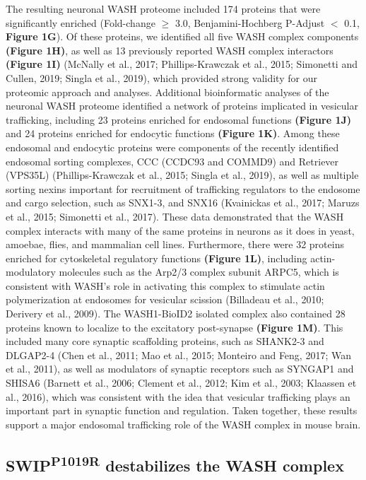 The resulting neuronal WASH proteome included 174 proteins that were
significantly enriched (Fold-change $\geq$ 3.0, Benjamini-Hochberg P-Adjust $<$ 0.1,
\textbf{Figure 1G}). Of these proteins, we identified all five WASH complex components
\textbf{(Figure 1H)}, as well as 13 previously reported WASH complex interactors 
\textbf{(Figure 1I)} (McNally et al., 2017; Phillips-Krawczak et al., 2015; Simonetti and
Cullen, 2019; Singla et al., 2019), which provided strong validity for our
proteomic approach and analyses. Additional bioinformatic analyses of the
neuronal WASH proteome identified a network of proteins implicated in vesicular
trafficking, including 23 proteins enriched for endosomal functions \textbf{(Figure 1J)}
and 24 proteins enriched for endocytic functions \textbf{(Figure 1K)}. Among these
endosomal and endocytic proteins were components of the recently identified
endosomal sorting complexes, CCC (CCDC93 and COMMD9) and Retriever (VPS35L)
(Phillips-Krawczak et al., 2015; Singla et al., 2019), as well as multiple
sorting nexins important for recruitment of trafficking regulators to the
endosome and cargo selection, such as SNX1-3, and SNX16 (Kvainickas et al.,
2017; Maruzs et al., 2015; Simonetti et al., 2017). These data demonstrated that
the WASH complex interacts with many of the same proteins in neurons as it does
in yeast, amoebae, flies, and mammalian cell lines. Furthermore, there were 32
proteins enriched for cytoskeletal regulatory functions \textbf{(Figure 1L)}, including
actin-modulatory molecules such as the Arp2/3 complex subunit ARPC5, which is
consistent with WASH’s role in activating this complex to stimulate actin
polymerization at endosomes for vesicular scission (Billadeau et al., 2010;
Derivery et al., 2009). The WASH1-BioID2 isolated complex also contained 28
proteins known to localize to the excitatory post-synapse \textbf{(Figure 1M)}. This
included many core synaptic scaffolding proteins, such as SHANK2-3 and DLGAP2-4
(Chen et al., 2011; Mao et al., 2015; Monteiro and Feng, 2017; Wan et al.,
2011), as well as modulators of synaptic receptors such as SYNGAP1 and SHISA6
(Barnett et al., 2006; Clement et al., 2012; Kim et al., 2003; Klaassen et al.,
2016), which was consistent with the idea that vesicular trafficking plays an
important part in synaptic function and regulation. Taken together, these
results support a major endosomal trafficking role of the WASH complex in mouse
brain. 

\subsection{SWIP\textsuperscript{P1019R} destabilizes the WASH complex}

